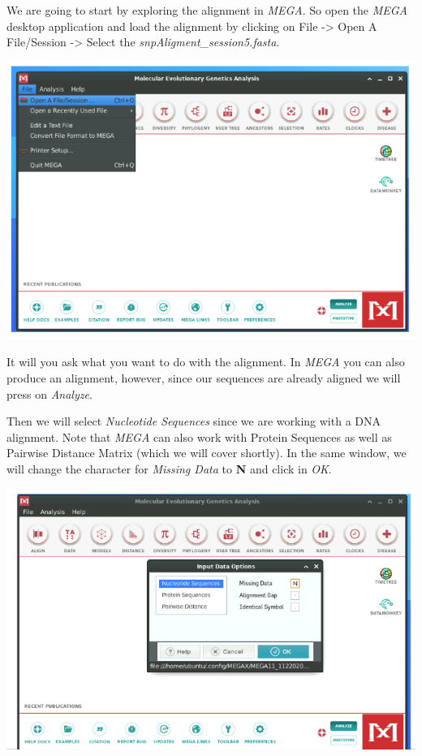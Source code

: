 \documentclass[
  letterpaper,
]{book}
\begin{document}
We are going to start by exploring the alignment in \emph{MEGA}. So open
the \emph{MEGA} desktop application and load the alignment by clicking
on File -\textgreater{} Open A File/Session -\textgreater{} Select the
\emph{snpAligment\_session5.fasta}.

\includegraphics{assets/images/chapters/phylogenomics/3.png}

It will you ask what you want to do with the alignment. In \emph{MEGA}
you can also produce an alignment, however, since our sequences are
already aligned we will press on \emph{Analyze}.

Then we will select \emph{Nucleotide Sequences} since we are working
with a DNA alignment. Note that \emph{MEGA} can also work with Protein
Sequences as well as Pairwise Distance Matrix (which we will cover
shortly). In the same window, we will change the character for
\emph{Missing Data} to \textbf{N} and click in \emph{OK}.

\includegraphics{assets/images/chapters/phylogenomics/4.png}
\end{document}
